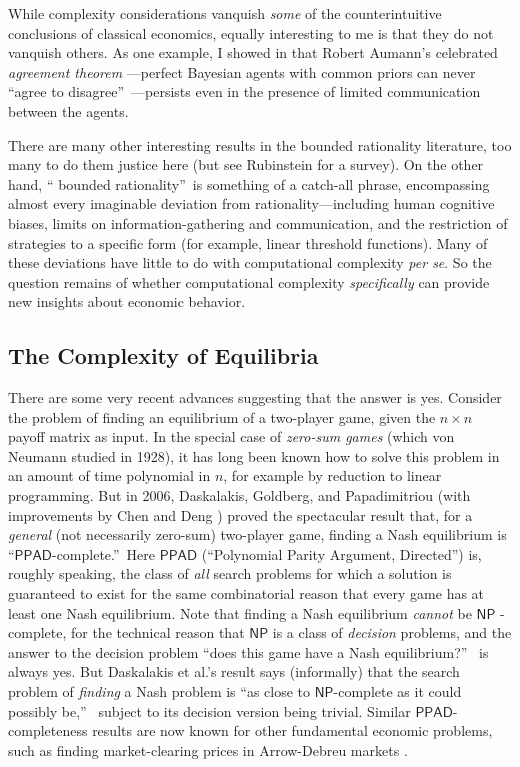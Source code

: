 \documentclass[12pt,onecolumn]{article}%
\begin{document}
While complexity considerations vanquish \textit{some} of
the counterintuitive conclusions of classical economics, equally interesting
to me is that they do not vanquish others. As one example, I showed in
\cite{aar:agr} that Robert Aumann's celebrated \textit{agreement theorem}
\cite{aumann}---perfect Bayesian agents with common priors can never
\textquotedblleft agree to disagree\textquotedblright\ ---persists even in the
presence of limited communication between the agents.

There are many other interesting results in the bounded rationality
literature, too many to do them justice here (but see Rubinstein
\cite{rubinstein:book} for a survey). On the other hand, \textquotedblleft
bounded rationality\textquotedblright\  is something of a catch-all phrase,
encompassing almost every imaginable deviation from rationality---including
human cognitive biases, limits on information-gathering and communication, and
the restriction of strategies to a specific form (for example, linear
threshold functions). Many of these deviations have little to do with
computational complexity \textit{per se}. So the question remains of whether
computational complexity \textit{specifically} can provide new insights about
economic behavior.

\subsection{The Complexity of Equilibria\label{EQUILIB}}

There are some very recent advances suggesting that the answer is yes.
 Consider the problem of finding an equilibrium of a two-player game, given
the $n\times n$ payoff matrix as input. In the special case of
\textit{zero-sum games} (which von Neumann studied in 1928), it has long been
known how to solve this problem in an amount of time polynomial in $n$, for
example by reduction to linear programming. But in 2006, Daskalakis,
Goldberg, and Papadimitriou \cite{dgp} (with improvements by Chen and Deng
\cite{chendeng}) proved the spectacular result that, for a \textit{general}
(not necessarily zero-sum) two-player game, finding a Nash equilibrium is
\textquotedblleft$\mathsf{PPAD}$-complete.\textquotedblright\  Here
$\mathsf{PPAD}$ (\textquotedblleft Polynomial Parity Argument,
Directed\textquotedblright ) is, roughly speaking, the class of \textit{all}
search problems for which a solution is guaranteed to exist for the same
combinatorial reason that every game has at least one Nash equilibrium. Note
that finding a Nash equilibrium \textit{cannot} be $\mathsf{NP}$%
-complete, for the technical reason that $\mathsf{NP}$ is a class of
\textit{decision }problems, and the answer to the decision problem
\textquotedblleft does this game have a Nash equilibrium?\textquotedblright\ %
 is always yes. But Daskalakis et al.'s result says (informally) that the
search problem of \textit{finding} a Nash problem is \textquotedblleft as
close to $\mathsf{NP}$-complete as it could possibly be,\textquotedblright\ %
 subject to its decision version being trivial. Similar $\mathsf{PPAD}%
$-completeness results are now known for other fundamental economic problems,
such as finding market-clearing prices in Arrow-Debreu markets \cite{cddt}.
\end{document}
